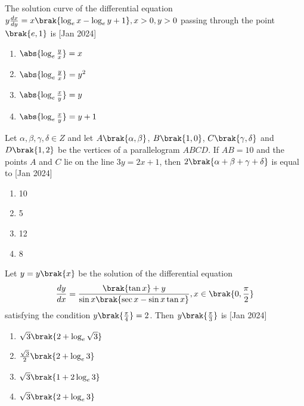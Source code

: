 \item The solution curve of the differential equation $y\frac{dx}{dy}
    = x\brak{\log_e x - \log_e y + 1}, x > 0, y > 0$ passing through the point
    $\brak{e, 1}$ is
    \hfill{[Jan 2024]}

    \begin{multicols}{2}
        \begin{enumerate}

            \item $\abs{\log_e \frac{y}{x}} = x$
            \item $\abs{\log_e \frac{y}{x}} = y^2$
            \item $\abs{\log_e \frac{x}{y}} = y$
            \item $\abs{\log_e \frac{x}{y}} = y + 1$
        \end{enumerate}
    \end{multicols}

\item Let $\alpha,\beta,\gamma,\delta \in Z$ and let $A\brak{\alpha,\beta}$,
    $B\brak{1, 0}$, $C\brak{\gamma,\delta}$ and $D\brak{1, 2}$ be the
    vertices of a parallelogram $ABCD$. If $AB = 10$ and the points
    $A$ and $C$ lie on the line $3y = 2x + 1$, then
    $2\brak{\alpha + \beta + \gamma + \delta}$ is equal to
    \hfill{[Jan 2024]}

    \begin{multicols}{4}
        \begin{enumerate}

            \item 10
            \item 5
            \item 12
            \item 8
        \end{enumerate}
    \end{multicols}

\item Let $y = y\brak{x}$ be the solution of the differential equation
    \begin{align*}
        \frac{dy}{dx} = \frac{\brak{\tan x} + y}{\sin x\brak{\sec x - \sin x \tan x}},
        x \in \brak{0, \frac{\pi}{2}}
    \end{align*}
    satisfying the condition $y\brak{\frac{\pi}{4}} = 2$.
    Then $y\brak{\frac{\pi}{3}}$ is
    \hfill{[Jan 2024]}

    \begin{multicols}{2}
        \begin{enumerate}

            \item $\sqrt{3}\brak{2 + \log_e \sqrt{3}}$
            \item $\frac{\sqrt{3}}{2}\brak{2 + \log_e 3}$
            \item $\sqrt{3}\brak{1 + 2 \log_e 3}$
            \item $\sqrt{3}\brak{2 + \log_e 3}$
        \end{enumerate}
    \end{multicols}

